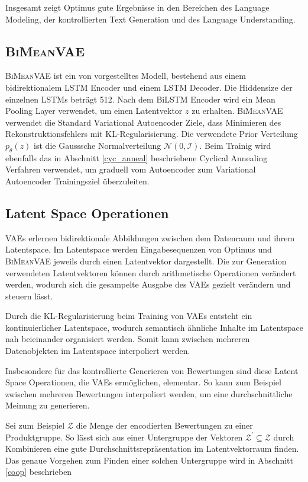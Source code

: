 Insgesamt zeigt Optimus gute Ergebnisse in den Bereichen des Language Modeling, der kontrollierten Text Generation und des Language Understanding.



\pagebreak
\subsection{\textsc{BiMeanVAE}}
\textsc{BiMeanVAE} ist ein von \citep{coop} vorgestelltes Modell, bestehend aus einem bidirektionalem LSTM Encoder und einem LSTM Decoder. 
Die Hiddensize der einzelnen LSTMs beträgt 512. Nach dem BiLSTM Encoder wird ein Mean Pooling Layer verwendet, um einen Latentvektor $z$ zu erhalten.
\textsc{BiMeanVAE} verwendet die Standard Variational Autoencoder Ziele, dass Minimieren des Rekonstruktionsfehlers mit KL-Regularisierung.
Die verwendete Prior Verteilung $p_\theta(z)$ ist die Gausssche Normalverteilung $\mathcal{N}(0,\mathcal{I})$. 
Beim Trainig wird ebenfalls das in Abschnitt \ref{cyc_anneal} beschriebene Cyclical Annealing Verfahren verwendet, um graduell vom Autoencoder zum Variational Autoencoder Trainingsziel überzuleiten.


\subsection{Latent Space Operationen}
VAEs erlernen bidirektionale Abbildungen zwischen dem Datenraum und ihrem Latentspace. 
Im Latentspace werden Eingabesequenzen von Optimus und \textsc{BiMeanVAE} jeweils durch einen Latentvektor dargestellt.
Die zur Generation verwendeten Latentvektoren können durch arithmetische Operationen verändert werden, wodurch sich die gesampelte Ausgabe des VAEs gezielt verändern und steuern lässt.

Durch die KL-Regularisierung beim Training von VAEs entsteht ein kontinuierlicher Latentspace, wodurch semantisch ähnliche Inhalte im Latentspace nah beieinander organisiert werden.
Somit kann zwischen mehreren Datenobjekten im Latentspace interpoliert werden.

Insbesondere für das kontrollierte Generieren von Bewertungen sind diese Latent Space Operationen, die VAEs ermöglichen, elementar.
So kann zum Beispiel zwischen mehreren Bewertungen interpoliert werden, um eine durchschnittliche Meinung zu generieren.

Sei zum Beispiel $\mathcal{Z}$ die Menge der encodierten Bewertungen zu einer Produktgruppe.
So lässt sich aus einer Untergruppe der Vektoren $\mathcal{Z}^{'} \subseteq \mathcal{Z}$ durch Kombinieren eine gute Durchschnittsrepräsentation im Latentvektorraum finden.
Das genaue Vorgehen zum Finden einer solchen Untergruppe wird in Abschnitt \ref{coop} beschrieben
\pagebreak
